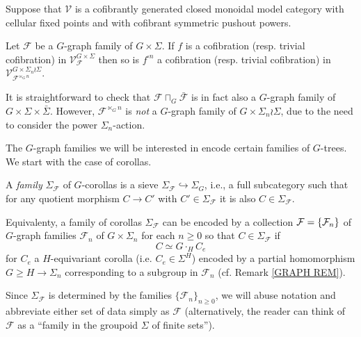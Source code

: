 \documentclass[a4paper,10pt]{article}%
\begin{document}
\begin{proposition}\label{POWERFG PROP}
Suppose that $\mathcal{V}$ is a cofibrantly generated closed monoidal model category with cellular fixed points and with cofibrant symmetric pushout powers.
	
	Let $\mathcal{F}$ be a $G$-graph family of $G \times \Sigma$. If $f$ is a cofibration (resp. trivial cofibration) in
	$\mathcal{V}^{G \times \Sigma}_{\mathcal{F}}$
	then so is $f^{\square n}$
a cofibration (resp. trivial cofibration) in 
	$\mathcal{V}^{G \times \Sigma_n \wr \Sigma}_{\mathcal{F}^{\ltimes_{G} n}}$.
\end{proposition}


\begin{remark}
	It is straightforward to check that 
	$\mathcal{F} \sqcap_G \bar{\mathcal{F}}$
	is in fact also a $G$-graph family of $G \times \Sigma \times \bar{\Sigma}$.
	However, $\mathcal{F}^{\ltimes_G n}$ is \textit{not}
	a $G$-graph family of $G \times \Sigma_n \wr \Sigma$,
	due to the need to consider the power $\Sigma_n$-action.
\end{remark}


The $G$-graph families we will be interested in encode certain families of $G$-trees. We start with the case of corollas.


\begin{definition}
	A \textit{family} $\Sigma_{\mathcal{F}}$ of $G$-corollas is a sieve 
	$\Sigma_{\mathcal{F}} \hookrightarrow \Sigma_G$, i.e., a full subcategory such that for any quotient morphism $C \to C'$ with $C' \in \Sigma_{\mathcal{F}}$ it is also $C \in \Sigma_{\mathcal{F}}$.
\end{definition}

\begin{remark}
	Equivalenty, a family of corollas $\Sigma_{\mathcal{F}}$
	can be encoded by
	a collection $\mathcal F = \left\{\mathcal F_n\right\}$  of $G$-graph families $\mathcal{F}_n$ of $G \times \Sigma_n$ for each $n \geq 0$ so that $C \in \Sigma_{\mathcal{F}}$ if 
	\[C \simeq G \cdot_H C_e\]
for $C_e$ a $H$-equivariant corolla 
(i.e. $C_e \in \Sigma^H$)
encoded by a partial homomorphism $G \geq H \to \Sigma_n$ corresponding to a subgroup in $\mathcal{F}_n$ 
	(cf. Remark \ref{GRAPH REM}). 
\end{remark}

Since $\Sigma_{\mathcal{F}}$ is determined by the families $\{\mathcal{F}_n\}_{n \geq 0}$, we will abuse notation and abbreviate either set of data simply as $\mathcal{F}$ (alternatively, the reader can think of $\mathcal{F}$ as a ``family in the groupoid $\Sigma$ of finite sets''). 
\end{document}

